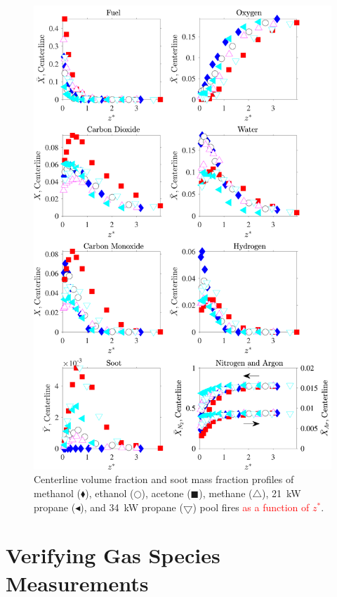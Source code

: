 \documentclass[12pt]{article}
\begin{document}
\begin{figure}[!]
	\centering
\includegraphics[width=12.5cm,keepaspectratio]{OVERALL_Fuel_Comparison.pdf}
	\caption[Centerline volume fraction and soot mass fraction profiles]{Centerline volume fraction and soot mass fraction profiles of methanol ($\blacklozenge$), ethanol ($\bigcirc$), acetone ($\blacksquare$), methane ($\triangle$), 21~kW propane ($\blacktriangleleft$), and 34~kW propane ($\bigtriangledown$) pool fires \textcolor{red}{ as a function of $z^*$}.}
	\label{fig:Fuel_Comparison}
\end{figure}


\clearpage

\section{Verifying Gas Species Measurements}
\label{ssec:Verifying_Vol_Frac_Measurements}
\end{document}
